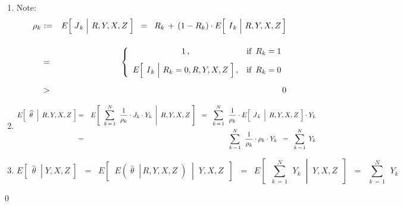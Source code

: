 \begin{enumerate}
\item
	Note:
	\begin{eqnarray*}
	\rho_{k}
	& \underset{{\color{white}\textnormal{\Huge 1}}}{:=} &
		E\!\left[\,\left.\overset{{\color{white}.}}{J}_{k}\;\right\vert\,R,Y,X,Z\;\right]
	\;\; = \;\;
		R_{k} \,+\, (1-R_{k}) \cdot E\!\left[\;\left.\overset{{\color{white}.}}{I}_{k}\;\right\vert\,R,Y,X,Z\,\right]
	\\
	& = &
		\left\{\begin{array}{cl}
		1\,, & \textnormal{if \,$R_{k} = 1$}
		\\
		\overset{{\color{white}1}}{E\!\left[\;\left.\overset{{\color{white}.}}{I}_{k}\;\right\vert\,R_{k}=0,R,Y,X,Z\;\right]}\,,
		& \textnormal{if \,$R_{k} = 0$}
		\end{array}\right.
	\\
	& > &
		\overset{{\color{white}\huge 1}}{0}
	\end{eqnarray*}
\item
	\begin{eqnarray*}
	E\!\left[\;\,\left.\widehat{\theta}\;\;\right\vert\;R,Y,X,Z\;\right]
	& = &
		E\!\left[\;\,
			\left.
			\overset{N}{\underset{k\,=\,1}{\sum}}\;\;
			\dfrac{1}{\rho_{k}} \cdot J_{k} \cdot Y_{k}
			\,\;\right\vert\;
			R,Y,X,Z
			\;\right]
	\;\; = \;\;
		\overset{N}{\underset{k\,=\,1}{\sum}}\;\;
		\dfrac{1}{\rho_{k}}
		\cdot
		E\!\left[\;
			\left.
			\overset{{\color{white}.}}{J}_{k} 
			\,\;\right\vert\;
			R,Y,X,Z
			\;\right]
		\cdot Y_{k}
	\\
	& = &
		\overset{N}{\underset{k\,=\,1}{\sum}}\;\;
		\dfrac{1}{\rho_{k}} \cdot \rho_{k} \cdot Y_{k}
	\;\; = \;\;
		\overset{N}{\underset{k\,=\,1}{\sum}}\;\, Y_{k}
	\end{eqnarray*}
\item
	\begin{equation*}
	E\!\left[\;\,\left.\widehat{\theta}\;\;\right\vert\;Y,X,Z\;\right]
	\;\; = \;\;
		E\!\left[\;\;
			\left.
			E\!\left(\;\left.\widehat{\theta}\;\;\right\vert\,R,Y,X,Z\;\right)
			\;\;\right\vert\;\;
			Y,X,Z
			\;\;\right]
	\;\; = \;\;
		E\!\left[\;\;
			\left.
			\overset{N}{\underset{k\,=\,1}{\sum}}\;\, Y_{k}
			\;\;\right\vert\;\;
			Y,X,Z
			\;\;\right]
	\;\; = \;\;
		\overset{N}{\underset{k\,=\,1}{\sum}}\;\, Y_{k}
	\end{equation*}	
\end{enumerate}
\qed



\renewcommand{\theenumi}{\roman{enumi}}
\renewcommand{\labelenumi}{\textnormal{(\theenumi)}$\;\;$}

